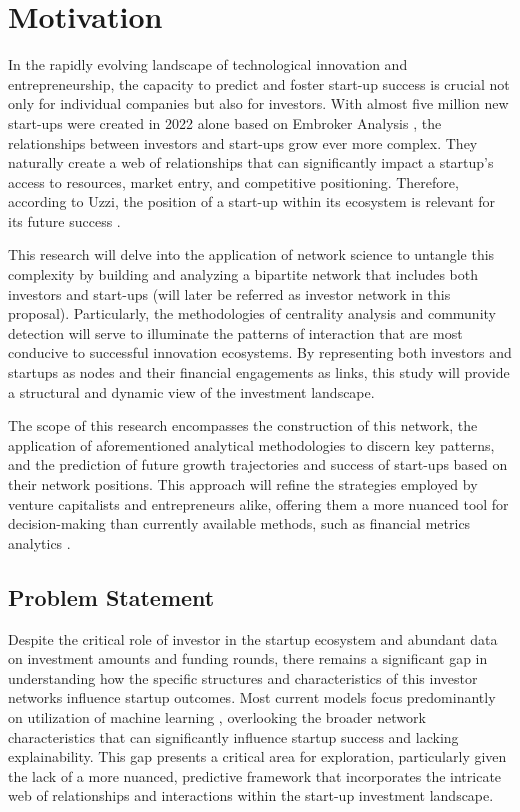 \documentclass[a4paper,11pt]{article}
\begin{document}
\section{Motivation}
In the rapidly evolving landscape of technological innovation and entrepreneurship, the capacity to predict and foster start-up success is crucial not only for individual companies but also for investors. With almost five million new start-ups were created in 2022 alone based on Embroker Analysis \cite{embroker2024a}, the relationships between investors and start-ups grow ever more complex. They naturally create a web of relationships that can significantly impact a startup’s access to resources, market entry, and competitive positioning. Therefore, according to Uzzi, the position of a start-up within its ecosystem is relevant for its future success \cite{uzzi2021a}.

This research will delve into the application of network science to untangle this complexity by building and analyzing a bipartite network that includes both investors and start-ups (will later be referred as investor network in this proposal). Particularly, the methodologies of centrality analysis and community detection will serve to illuminate the patterns of interaction that are most conducive to successful innovation ecosystems. By representing both investors and startups as nodes and their financial engagements as links, this study will provide a structural and dynamic view of the investment landscape.

The scope of this research encompasses the construction of this network, the application of aforementioned analytical methodologies to discern key patterns, and the prediction of future growth trajectories and success of start-ups based on their network positions. This approach will refine the strategies employed by venture capitalists and entrepreneurs alike, offering them a more nuanced tool for decision-making than currently available methods, such as financial metrics analytics \cite{gompers2016a}.

\subsection{Problem Statement}
Despite the critical role of investor in the startup ecosystem and abundant data on investment amounts and funding rounds, there remains a significant gap in understanding how the specific structures and characteristics of this investor networks influence startup outcomes. Most current models focus predominantly on utilization of machine learning \cite{krishna2016a} \cite{carniel2023a} \cite{sharchilev2018a} \cite{yang2020a}, overlooking the broader network characteristics that can significantly influence startup success and lacking explainability. This gap presents a critical area for exploration, particularly given the lack of a more nuanced, predictive framework that incorporates the intricate web of relationships and interactions within the start-up investment landscape.
\end{document}
